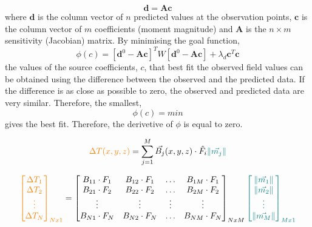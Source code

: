 \begin{equation}
    \mathbf{d} = \mathbf{Ac}
\end{equation}
where $\mathbf{d}$ is the column vector of $n$ predicted values at the observation points, $\mathbf{c}$ is the column vector of $m$ coefficients (moment magnitude) and $\mathbf{A}$ is the $n \times m$ sensitivity (Jacobian) matrix. By minimising the goal function,
\begin{equation}
    \phi(c) = [\mathbf{d}^0 - \mathbf{Ac}]^T W[\mathbf{d}^0 - \mathbf{Ac}] + \lambda_d \mathbf{c}^T\mathbf{c}
\end{equation}
the values of the source coefficients, $c$, that best fit the observed field values can be obtained using the difference between the observed and the predicted data. If the difference is as close as possible to zero, the observed and predicted data are very similar. Therefore, the smallest,
\begin{equation}
    \phi(c) = min
\end{equation}
gives the best fit. Therefore, the derivetive of $\phi$ is equal to zero.


\begin{equation}
\textcolor{orange}{\Delta T (x, y, z)} = \sum_{j=1}^{M}  \vec{B_j}(x, y, z) \cdot \hat{F_i} \textcolor{teal}{\left\lVert \vec{m_j} \right\rVert}
\end{equation}

\begin{equation}
\textcolor{orange}{\begin{bmatrix}
    \Delta T_1 \\ \Delta T_2 \\ \vdots \\ \Delta T_N
\end{bmatrix}_{Nx1}} = \begin{bmatrix}
    B_{11} \cdot F_{1} & B_{12} \cdot F_{1} & \hdots & B_{1M} \cdot F_{1} \\
    B_{21} \cdot F_{2} & B_{22} \cdot F_{2} & \hdots & B_{2M} \cdot F_{2} \\
    \vdots & \vdots & \vdots & \vdots \\
    B_{N1} \cdot F_{N} & B_{N2} \cdot F_{N} & \hdots & B_{NM} \cdot F_{N} \\
\end{bmatrix}_{NxM} \textcolor{teal}{\begin{bmatrix}
    \left\lVert \vec{m_1} \right\rVert \\ \left\lVert \vec{m_2} \right\rVert \\ \vdots \\ \left\lVert \vec{m_M} \right\rVert
\end{bmatrix}_{Mx1}}
\end{equation}

